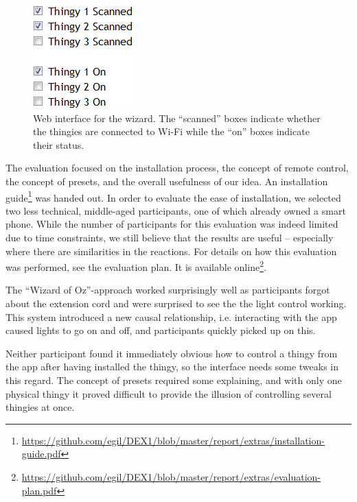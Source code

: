 \documentclass{ubicomp2012}
\begin{document}
\begin{figure}[th]
\begin{center}
\includegraphics[width=0.4\columnwidth]{figures/prototype-wizard-interface.png}
\end{center}
\caption{Web interface for the wizard. The ``scanned'' boxes indicate whether the thingies are connected to Wi-Fi while the ``on'' boxes indicate their status.}
\label{fig:wizardInterface}
\end{figure}

The evaluation focused on the installation process, the concept of remote control, the concept of presets, and the overall usefulness of our idea. An installation guide\footnote{\url{https://github.com/egil/DEX1/blob/master/report/extras/installation-guide.pdf}} was handed out. In order to evaluate the ease of installation, we selected two less technical, middle-aged participants, one of which already owned a smart phone. While the number of participants for this evaluation was indeed limited due to time constraints, we still believe that the results are useful -- especially where there are similarities in the reactions. For details on how this evaluation was performed, see the evaluation plan. It is available online\footnote{\url{https://github.com/egil/DEX1/blob/master/report/extras/evaluation-plan.pdf}}.

The ``Wizard of Oz''-approach worked surprisingly well as participants forgot about the extension cord and were surprised to see the the light control working. This system introduced a new causal relationship\cite{causalReasoning}, i.e. interacting with the app caused lights to go on and off, and participants quickly picked up on this.

Neither participant found it immediately obvious how to control a thingy from the app after having installed the thingy, so the interface needs some tweaks in this regard. The concept of presets required some explaining, and with only one physical thingy it proved difficult to provide the illusion of controlling several thingies at once.
\end{document}
